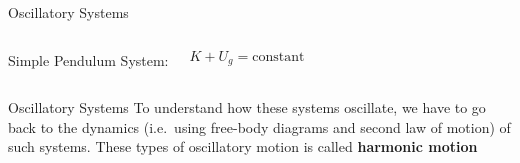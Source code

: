 \documentclass[12pt,compress,aspectratio=169]{beamer}
\begin{document}
\begin{frame}{Oscillatory Systems}
\begin{columns}[T]
    \centering

    {\footnotesize Simple Pendulum System:}\\

    \vspace{-.3in}\begin{displaymath}
      K+U_g=\text{constant}
    \end{displaymath}
  \end{columns}  
\end{frame}


\begin{frame}{Oscillatory Systems}
  To understand how these systems oscillate, we have to go back to the
  dynamics (i.e.\ using free-body diagrams and second law of motion) of such
  systems. These types of oscillatory motion is called \textbf{harmonic motion}
\end{frame}
\end{document}

